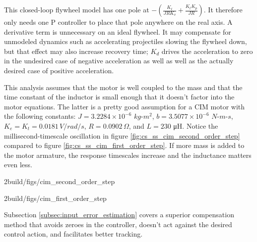 This closed-loop flywheel model has one pole at
$-\left(\frac{K_t}{JRK_v} + \frac{K_t K_p}{JR}\right)$. It therefore only needs
one P controller to place that pole anywhere on the real axis. A derivative
term is unnecessary on an ideal flywheel. It may compensate for unmodeled
dynamics such as accelerating projectiles slowing the flywheel down, but that
effect may also increase recovery time; $K_d$ drives the acceleration to zero in
the undesired case of negative acceleration as well as well as the actually
desired case of positive acceleration.

This analysis assumes that the motor is well coupled to the mass and that the
time constant of the inductor is small enough that it doesn't factor into the
motor equations. The latter is a pretty good assumption for a CIM motor with the
following constants: $J = 3.2284 \times 10^{-6}$ $kg$-$m^2$,
$b = 3.5077 \times 10^{-6}$ $N$-$m$-$s$, $K_e = K_t = 0.0181 \,V/rad/s$,
$R = 0.0902 \,\Omega$, and $L = 230$ μH. Notice the millisecond-timescale
oscillation in figure \ref{fig:cs_ss_cim_second_order_step} compared to figure
\ref{fig:cs_ss_cim_first_order_step}. If more mass is added to the motor
armature, the response timescales increase and the inductance matters even less.
\begin{bookfigure}
  \begin{minisvg}{2}{build/figs/cim_second_order_step}
    \caption{Second-order CIM motor model step response ($L = 230$ μH)}
    \label{fig:cs_ss_cim_second_order_step}
  \end{minisvg}
  \hfill
  \begin{minisvg}{2}{build/figs/cim_first_order_step}
    \caption{First-order CIM motor model step response ($L = 0$ μH)}
    \label{fig:cs_ss_cim_first_order_step}
  \end{minisvg}
\end{bookfigure}

Subsection \ref{subsec:input_error_estimation} covers a superior compensation
method that avoids zeroes in the \gls{controller}, doesn't act against the
desired control action, and facilitates better \gls{tracking}.
